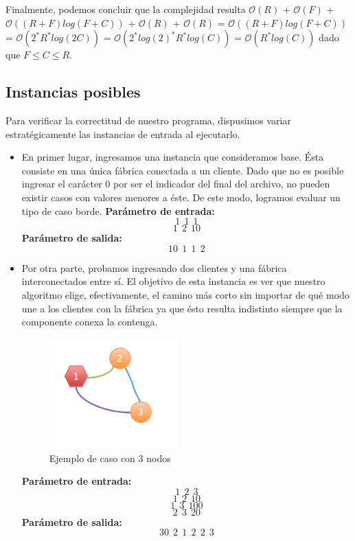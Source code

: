  Finalmente, podemos concluir que la complejidad resulta $\mathcal{O}(R)$ + $\mathcal{O}(F)$ + $\mathcal{O}((R+F)log(F+C))$ + $\mathcal{O}(R)$ + $\mathcal{O}(R)$ =  $\mathcal{O}((R+F)log(F+C))$ = $\mathcal{O}(2^*R^*log(2C))$ = $\mathcal{O}(2^*log(2)^*R^*log(C))$ = $\mathcal{O}(R^*log(C))$ dado que $F \leq C \leq R$.


\subsection{Instancias posibles}
Para verificar la correctitud de nuestro programa, dispusimos variar estratégicamente las instancias de entrada al ejecutarlo.
\begin{itemize}

\item En primer lugar, ingresamos una instancia que consideramos base. Ésta consiste en una única fábrica conectada a un cliente. Dado que no es posible ingresar el carácter 0 por ser el indicador del final del archivo, no pueden existir casos con valores menores a éste.
De este modo, logramos evaluar un tipo de caso borde.\newline
\textbf{Parámetro de entrada:} $$1\ \ 1\ \ 1$$
$$1\ \ 2\ \ 10$$
\textbf{Parámetro de salida:} $$10\ \ 1\ \ 1\ \ 2$$


\item Por otra parte, probamos ingresando dos clientes y una fábrica interconectados entre sí. El objetivo de esta instancia es ver que nuestro algoritmo elige, efectivamente, el camino más corto sin importar de qué modo une a los clientes con la fábrica ya que ésto resulta indistinto siempre que la componente conexa la contenga. \newline
\begin{figure}[H] %
\begin{center}
\includegraphics[width=140pt]{../imgs/caso1-ej3.png}
\end{center}
  \hfill
\caption{Ejemplo de caso con 3 nodos}
\end{figure}
\textbf{Parámetro de entrada:} $$1\ \  2\ \  3$$
$$1\ \  2\ \  10$$
$$1\ \  3\ \  100$$
$$2\ \  3\ \  20$$																											
\textbf{Parámetro de salida:} $$30\ \ 2\ \ 1\ \ 2\ \ 2\ \ 3$$



\end{itemize}
